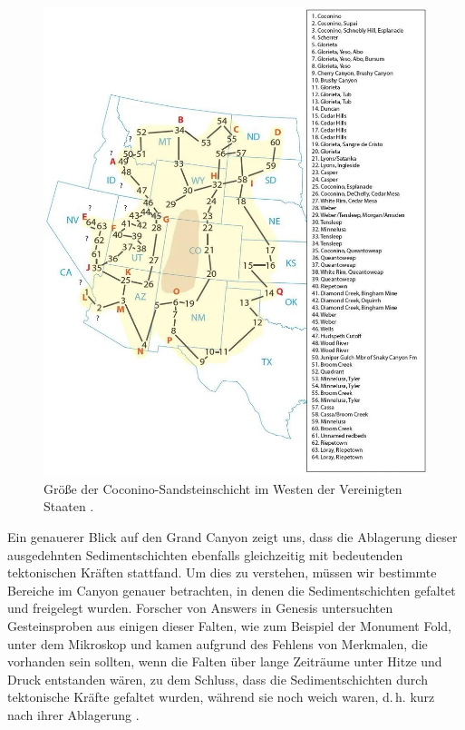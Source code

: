 \documentclass[10pt,twocolumn,letterpaper]{article}
\begin{document}
\begin{figure}[t]
\begin{center}
   \includegraphics[width=1\linewidth]{coconino.jpg}
\end{center}
   \caption{Größe der Coconino-Sandsteinschicht im Westen der Vereinigten Staaten \cite{21}.}
\label{fig:3}
\label{fig:onecol}
\end{figure}

Ein genauerer Blick auf den Grand Canyon zeigt uns, dass die Ablagerung dieser ausgedehnten Sedimentschichten ebenfalls gleichzeitig mit bedeutenden tektonischen Kräften stattfand. Um dies zu verstehen, müssen wir bestimmte Bereiche im Canyon genauer betrachten, in denen die Sedimentschichten gefaltet und freigelegt wurden. Forscher von Answers in Genesis \cite{42} untersuchten Gesteinsproben aus einigen dieser Falten, wie zum Beispiel der Monument Fold, unter dem Mikroskop und kamen aufgrund des Fehlens von Merkmalen, die vorhanden sein sollten, wenn die Falten über lange Zeiträume unter Hitze und Druck entstanden wären, zu dem Schluss, dass die Sedimentschichten durch tektonische Kräfte gefaltet wurden, während sie noch weich waren, d.\,h. kurz nach ihrer Ablagerung \cite{43}.
\end{document}
